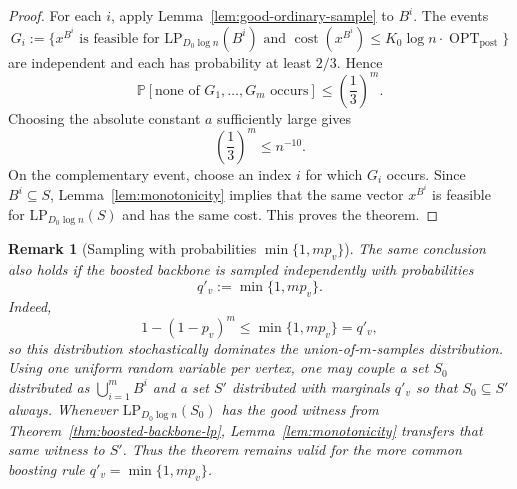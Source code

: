 \documentclass[11pt]{article}
\newtheorem{remark}{Remark}
\DeclareMathOperator{\OPT}{OPT}
\newcommand{\Prb}{\mathbb{P}}
\newcommand{\1}{\mathbf{1}}
\newcommand{\cost}{\operatorname{cost}}
\begin{document}
\begin{proof}
For each $i$, apply Lemma~\ref{lem:good-ordinary-sample} to $B^i$.  The events
\[
  G_i:=\{x^{B^i}\text{ is feasible for }\mathrm{LP}_{D_0\log n}(B^i)
  \text{ and }\cost(x^{B^i})\le K_0\log n\cdot \OPT_{\mathrm{post}}\}
\]
are independent and each has probability at least $2/3$.  Hence
\[
  \Prb[\text{none of }G_1,\ldots,G_m\text{ occurs}]
  \le \left(\frac13\right)^m.
\]
Choosing the absolute constant $a$ sufficiently large gives
\[
  \left(\frac13\right)^m\le n^{-10}.
\]
On the complementary event, choose an index $i$ for which $G_i$ occurs.  Since
$B^i\subseteq S$, Lemma~\ref{lem:monotonicity} implies that the same vector
$x^{B^i}$ is feasible for $\mathrm{LP}_{D_0\log n}(S)$ and has the same cost.
This proves the theorem.
\end{proof}

\begin{remark}[Sampling with probabilities $\min\{1,mp_v\}$]
The same conclusion also holds if the boosted backbone is sampled independently
with probabilities
\[
  q'_v:=\min\{1,mp_v\}.
\]
Indeed,
\[
  1-(1-p_v)^m\le \min\{1,mp_v\}=q'_v,
\]
so this distribution stochastically dominates the union-of-$m$-samples
distribution.  Using one uniform random variable per vertex, one may couple a
set $S_0$ distributed as $\bigcup_{i=1}^m B^i$ and a set $S'$ distributed with
marginals $q'_v$ so that $S_0\subseteq S'$ always.  Whenever
$\mathrm{LP}_{D_0\log n}(S_0)$ has the good witness from
Theorem~\ref{thm:boosted-backbone-lp}, Lemma~\ref{lem:monotonicity} transfers
that same witness to $S'$.  Thus the theorem remains valid for the more common
boosting rule $q'_v=\min\{1,mp_v\}$.
\end{remark}
\end{document}
